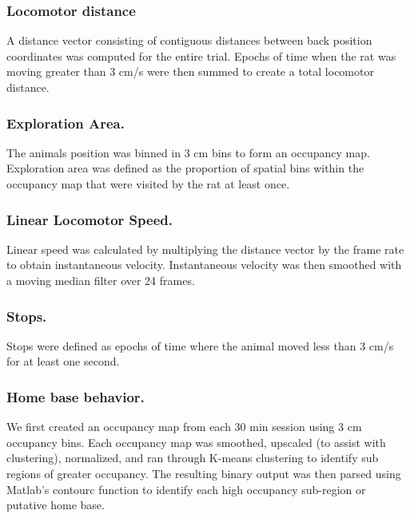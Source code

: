 \documentclass[fleqn,10pt]{wlscirep}
\begin{document}
\subsubsection*{Locomotor distance} A distance vector consisting of contiguous distances between back position coordinates was computed for the entire trial. Epochs of time when the rat was moving greater than 3 cm/s were then summed to create a total locomotor distance.  

\subsubsection*{Exploration Area.} The animals position was binned in 3 cm bins to form an occupancy map. Exploration area was defined as the proportion of spatial bins within the occupancy map that were visited by the rat at least once. 

\subsubsection*{Linear Locomotor Speed.} Linear speed was calculated by multiplying the distance vector by the frame rate to obtain instantaneous velocity. Instantaneous velocity was then smoothed with a moving median filter over 24 frames. 


\subsubsection*{Stops.} Stops were defined as epochs of time where the animal moved less than 3 cm/s for at least one second. 

\subsubsection*{Home base behavior.} We first created an occupancy map from each 30 min session using 3 cm occupancy bins. Each occupancy map was smoothed, upscaled (to assist with clustering), normalized, and ran through K-means clustering to identify sub regions of greater occupancy. The resulting binary output was then parsed using Matlab's contourc function to identify each high occupancy sub-region or putative home base. 
\end{document}
